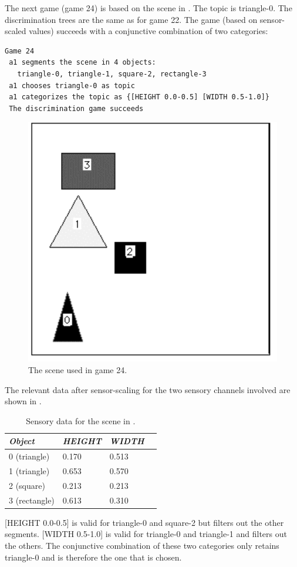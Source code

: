 The next game (game 24) is based on the scene in 
. The topic is triangle-0. 
The discrimination trees are the same as for
game 22. The game (based on sensor-scaled values)
succeeds with a conjunctive combination of two
categories: 
\begin{verbatim}
Game 24
 a1 segments the scene in 4 objects: 
   triangle-0, triangle-1, square-2, rectangle-3 
 a1 chooses triangle-0 as topic
 a1 categorizes the topic as {[HEIGHT 0.0-0.5] [WIDTH 0.5-1.0]}
 The discrimination game succeeds
\end{verbatim}
\begin{figure}[htbp]
  \centerline{\includegraphics[width=.40\textwidth]{chap4/figs/game24}}
\caption{\label{scene4} The scene used in game 24.}
\end{figure}
The relevant data after sensor-scaling for the 
two sensory channels involved are shown in . 
\begin{table}
\begin{center}
\begin{tabular}{ l  l  l  l } \hline
{\it Object} & {\it HEIGHT} & {\it WIDTH} \\ \hline
0 (triangle) & 0.170 & 0.513  \\ \hline
1 (triangle) & 0.653 & 0.570 \\ \hline 
2 (square) & 0.213 & 0.213 \\ \hline 
3 (rectangle) & 0.613 & 0.310 \\ \hline 
\end{tabular}
\caption{\label{tab:t-game24} Sensory data for the scene in .}
\end{center}
\end{table}

[HEIGHT 0.0-0.5] is valid for triangle-0 and square-2 but
filters out the other segments. 
[WIDTH 0.5-1.0] is valid for triangle-0 and triangle-1 and 
filters out the others.  
The conjunctive combination of these two categories only 
retains triangle-0 and is therefore the one that is chosen. 

